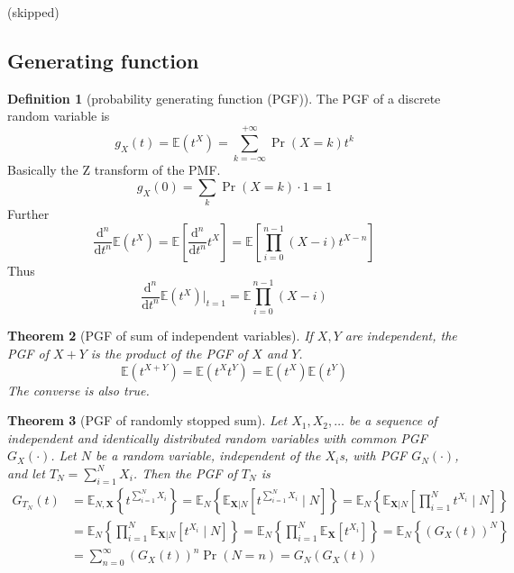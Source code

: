 \documentclass{article}
\newtheorem{theorem}{Theorem}[section]
\theoremstyle{definition}
\newtheorem{definition}[theorem]{Definition}
\theoremstyle{remark}
\newcommand{\E}{\mathbb{E}}
\begin{document}
(skipped)

\subsection{Generating function}

\begin{definition}[probability generating function (PGF)]
	The PGF of a discrete random variable is
	\[
		g_X(t) = \E(t^X) = \sum_{k=-\infty}^{+\infty} \Pr(X=k) t^k
	\]
	Basically the Z transform of the PMF.
	\[
		g_X(0) = \sum_k \Pr(X=k) \cdot 1 = 1
	\]
	Further
	\[
		\frac{\mathrm{d}^n}{\mathrm{d}t^n}\E(t^X) =
		\E\left[\frac{\mathrm{d}^n}{\mathrm{d}t^n} t^X \right] = \E\left[ \prod_{i=0}^{n-1} (X-i) t^{X-n} \right]
	\]
	Thus
	\[
		\frac{\mathrm{d}^n}{\mathrm{d}t^n}\E(t^X) \vert_{t=1} = \E \prod_{i=0}^{n-1} (X-i)
	\]
\end{definition}
\begin{theorem}[PGF of sum of independent variables]
	If \(X,Y\) are independent, the PGF of \(X+Y\) is the product of the PGF of \(X\) and \(Y\).
	\[
		\E(t^{X+Y}) = \E(t^X t^Y) = \E(t^X) \E(t^Y)
	\]
	The converse is also true.
\end{theorem}
\begin{theorem}[PGF of randomly stopped sum]
	Let \(X_1, X_2, \ldots\) be a sequence of independent and identically distributed random variables with common PGF \(G_X(\cdot)\). Let \(N\) be a random variable, independent of the \(X_i\)s, with PGF \(G_N(\cdot)\), and let \(T_N=\sum_{i=1}^N X_i\).
	Then the PGF of \(T_N\) is
	\begin{align*}
		G_{T_N}(t) & = \E_{N,\mathbf{X}}\left\{ t^{\sum_{i=1}^N X_i} \right\}
		= \E_N\left\{ \E_{\mathbf{X}|N}\left[ t^{\sum_{i=1}^N X_i} \mid N \right] \right\}
		= \E_N\left\{ \E_{\mathbf{X}|N}\left[ \prod_{i=1}^N t^{X_i} \mid N \right] \right\}               \\
		           & = \E_N\left\{ \prod_{i=1}^N \E_{\mathbf{X}|N}\left[  t^{X_i} \mid N \right] \right\}
		= \E_N\left\{ \prod_{i=1}^N \E_{\mathbf{X}}\left[  t^{X_i} \right] \right\}
		= \E_N\left\{ {(G_X(t))}^N \right\}                                                               \\
		           & = \sum_{n=0}^{\infty} {(G_X(t))}^n \Pr(N=n)
		= G_N(G_X(t))
	\end{align*}
\end{theorem}
\end{document}
